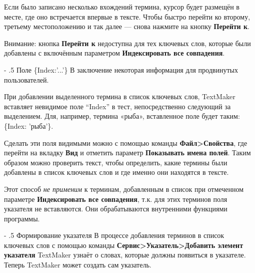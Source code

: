 ﻿\documentclass[a4paper,10pt]{article}
\makeatletter
\renewcommand\paragraph{%
   \@startsection{paragraph}{4}{0mm}%
      {-\baselineskip}%
      {.5\baselineskip}%
      {\normalfont\normalsize\bfseries}}
\makeatother
\begin{document}
Если было записано несколько вхождений термина, курсор будет размещён в месте, где оно встречается впервые в тексте. Чтобы быстро перейти ко второму, третьему местоположению и так далее — снова нажмите на кнопку \textbf{Перейти к}.

Внимание: кнопка \textbf{Перейти к} недоступна для тех ключевых слов, которые были добавлены с включённым параметром \textbf{Индексировать все совпадения}.

\paragraph{Поле \{Index:'...'\}}
В заключение некоторая информация для продвинутых пользователей.

При добавлении выделенного термина в список ключевых слов, TextMaker вставляет невидимое поле “Index” в тест, непосредственно следующий за выделением. Для, например, термина «рыба», вставленное поле будет таким: \{Index: 'рыба'\}.

Сделать эти поля видимыми можно с помощью команды \textbf{Файл>Свойства}, где перейти на вкладку \textbf{Вид} и отметить параметр \textbf{Показывать имена полей}. Таким образом можно проверить текст, чтобы определить, какие термины были добавлены в список ключевых слов и где именно они находятся в тексте.

Этот способ \textit{не применим} к терминам, добавленным в список при отмеченном параметре \textbf{Индексировать все совпадения}, т.к. для  этих терминов поля указателя не вставляются. Они обрабатываются внутренними функциями программы.

\paragraph{Формирование указателя}
В процессе добавления терминов в список ключевых слов с помощью команды \textbf{Сервис>Указатель>Добавить элемент указателя} TextMaker узнаёт о словах, которые должны появиться в указателе. Теперь TextMaker может создать сам указатель.
\end{document}
